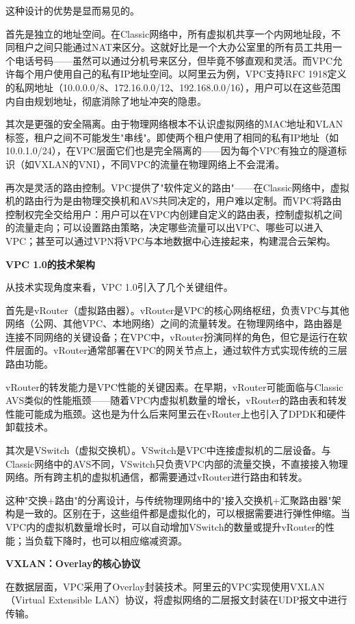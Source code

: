 这种设计的优势是显而易见的。

首先是独立的地址空间。在Classic网络中，所有虚拟机共享一个内网地址段，不同租户之间只能通过NAT来区分。这就好比是一个大办公室里的所有员工共用一个电话号码——虽然可以通过分机号来区分，但毕竟不够直观和灵活。而VPC允许每个用户使用自己的私有IP地址空间。以阿里云为例，VPC支持RFC 1918定义的私网地址（10.0.0.0/8、172.16.0.0/12、192.168.0.0/16），用户可以在这些范围内自由规划地址，彻底消除了地址冲突的隐患。

其次是更强的安全隔离。由于物理网络根本不认识虚拟网络的MAC地址和VLAN标签，租户之间不可能发生"串线"。即使两个租户使用了相同的私有IP地址（如10.0.1.0/24），在VPC层面它们也是完全隔离的——因为每个VPC有独立的隧道标识（如VXLAN的VNI），不同VPC的流量在物理网络上不会混淆。

再次是灵活的路由控制。VPC提供了"软件定义的路由"——在Classic网络中，虚拟机的路由行为是由物理交换机和AVS共同决定的，用户难以定制。而VPC将路由控制权完全交给用户：用户可以在VPC内创建自定义的路由表，控制虚拟机之间的流量走向；可以设置路由策略，决定哪些流量可以出VPC、哪些可以进入VPC；甚至可以通过VPN将VPC与本地数据中心连接起来，构建混合云架构。

\textbf{VPC 1.0的技术架构}

从技术实现角度来看，VPC 1.0引入了几个关键组件。

首先是vRouter（虚拟路由器）。vRouter是VPC的核心网络枢纽，负责VPC与其他网络（公网、其他VPC、本地网络）之间的流量转发。在物理网络中，路由器是连接不同网络的关键设备；在VPC中，vRouter扮演同样的角色，但它是运行在软件层面的。vRouter通常部署在VPC的网关节点上，通过软件方式实现传统的三层路由功能。

vRouter的转发能力是VPC性能的关键因素。在早期，vRouter可能面临与Classic AVS类似的性能瓶颈——随着VPC内虚拟机数量的增长，vRouter的路由表和转发性能可能成为瓶颈。这也是为什么后来阿里云在vRouter上也引入了DPDK和硬件卸载技术。

其次是VSwitch（虚拟交换机）。VSwitch是VPC中连接虚拟机的二层设备。与Classic网络中的AVS不同，VSwitch只负责VPC内部的流量交换，不直接接入物理网络。所有跨主机的虚拟机通信，都需要通过vRouter进行路由和转发。

这种"交换+路由"的分离设计，与传统物理网络中的"接入交换机+汇聚路由器"架构是一致的。区别在于，这些组件都是虚拟化的，可以根据需要进行弹性伸缩。当VPC内的虚拟机数量增长时，可以自动增加VSwitch的数量或提升vRouter的性能；当负载下降时，也可以相应缩减资源。

\textbf{VXLAN：Overlay的核心协议}

在数据层面，VPC采用了Overlay封装技术。阿里云的VPC实现使用VXLAN（Virtual Extensible LAN）协议，将虚拟网络的二层报文封装在UDP报文中进行传输。

